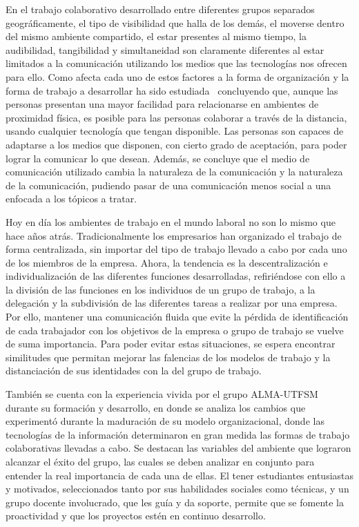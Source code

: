 En el trabajo colaborativo desarrollado entre diferentes grupos separados
geográficamente, el tipo de visibilidad que halla de los demás, el moverse
dentro del mismo ambiente compartido, el estar presentes al mismo tiempo, la
audibilidad, tangibilidad y simultaneidad son claramente diferentes al estar
limitados a la comunicación utilizando los medios que las tecnologías nos
ofrecen para ello. Como afecta cada uno de estos factores a la forma de
organización y la forma de trabajo a desarrollar ha sido
estudiada~\cite{proximity_collaboration} concluyendo que, aunque las personas
presentan una mayor facilidad para relacionarse en ambientes de proximidad
física, es posible para las personas colaborar a través de la distancia,
usando cualquier tecnología que tengan disponible. Las personas son capaces de
adaptarse a los medios que disponen, con cierto grado de aceptación, para poder
lograr la comunicar lo que desean. Además, se concluye que el medio de
comunicación utilizado cambia la naturaleza de la comunicación y la naturaleza
de la comunicación, pudiendo pasar de una comunicación menos social a una
enfocada a los tópicos a tratar.

Hoy en día los ambientes de trabajo en el mundo laboral no son lo mismo que
hace años atrás. Tradicionalmente los empresarios han organizado el trabajo de
forma centralizada, sin importar del tipo de trabajo llevado a cabo por cada
uno de los miembros de la empresa. Ahora, la tendencia es la descentralización
e individualización de las diferentes funciones desarrolladas, refiriéndose
con ello a la división de las funciones en los individuos de un grupo de
trabajo, a la delegación y la subdivisión de las diferentes tareas a
realizar por una empresa.
Por ello, mantener una comunicación fluida que evite la pérdida de
identificación de cada trabajador con los objetivos de la empresa o grupo de
trabajo se vuelve de suma importancia.
Para poder evitar estas situaciones, se espera encontrar similitudes que
permitan mejorar las falencias de los modelos de trabajo y la distanciación de
sus identidades con la del grupo de trabajo\cite{trabajo_flexible}.

También se cuenta con la experiencia vivida por el grupo ALMA-UTFSM durante
su formación y desarrollo\cite{utfsm_alma}, en donde se analiza los cambios
que experimentó durante la maduración de su modelo organizacional, donde las
tecnologías de la información determinaron en gran medida las formas de
trabajo colaborativas llevadas a cabo. Se destacan las variables del ambiente
que lograron alcanzar el éxito del grupo, las cuales se deben analizar en
conjunto para entender la real importancia de cada una de ellas. El tener estudiantes
entusiastas y motivados, seleccionados tanto por sus habilidades sociales como
técnicas, y un grupo docente involucrado, que les guía y da soporte, permite
que se fomente la proactividad y que los proyectos estén en
continuo desarrollo.

